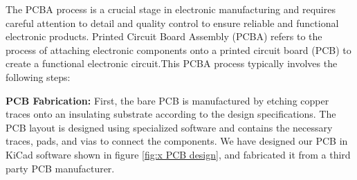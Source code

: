 The PCBA process is a crucial stage in electronic manufacturing and requires careful attention to detail and quality control to ensure reliable and functional electronic products. Printed Circuit Board Assembly (PCBA) refers to the process of attaching electronic components onto a printed circuit board (PCB) to create a functional electronic circuit.This PCBA process typically involves the following steps:
\par
\textbf{PCB Fabrication: } 
 First, the bare PCB is manufactured by etching copper traces onto an insulating substrate according to the design specifications. The PCB layout is designed using specialized software and contains the necessary traces, pads, and vias to connect the components. We have designed our PCB in KiCad software shown in figure \ref{fig:x PCB design}, and fabricated it from a third party PCB manufacturer.\par

